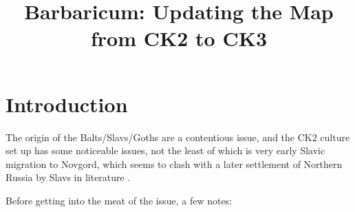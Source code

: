 \documentclass{article}
\title{Barbaricum: Updating the Map from CK2 to CK3}
\begin{document}
	
	\maketitle
	
	\section{Introduction}
	\label{sec:intro}
	
	The origin of the Balts/Slavs/Goths are a contentious issue, and the CK2 culture set up has some noticeable issues, not the least of which is very early Slavic migration to Novgord, which seems to clash with a later settlement of Northern Russia by Slavs in literature \cite{EmergenceOfRussia}.
	
	Before getting into the meat of the issue, a few notes:
	
\end{document}

